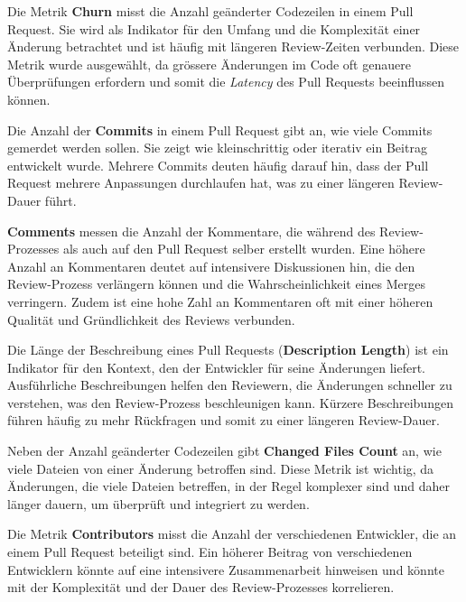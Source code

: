 Die Metrik \textbf{Churn} misst die Anzahl geänderter Codezeilen in einem Pull Request. Sie wird als Indikator für den Umfang und die Komplexität einer Änderung betrachtet und ist häufig mit längeren Review-Zeiten verbunden. Diese Metrik wurde ausgewählt, da grössere Änderungen im Code oft genauere Überprüfungen erfordern und somit die \textit{Latency} des Pull Requests beeinflussen können. \parencite{gousios_exploratory_2014}

Die Anzahl der \textbf{Commits} in einem Pull Request gibt an, wie viele Commits gemerdet werden sollen. Sie zeigt wie kleinschrittig oder iterativ ein Beitrag entwickelt wurde. Mehrere Commits deuten häufig darauf hin, dass der Pull Request mehrere Anpassungen durchlaufen hat, was zu einer längeren Review-Dauer führt. \parencite{zhang_pull_2022}

\textbf{Comments} messen die Anzahl der Kommentare, die während des Review-Prozesses als auch auf den Pull Request selber erstellt wurden. Eine höhere Anzahl an Kommentaren deutet auf intensivere Diskussionen hin, die den Review-Prozess verlängern können und die Wahrscheinlichkeit eines Merges verringern. Zudem ist eine hohe Zahl an Kommentaren oft mit einer höheren Qualität und Gründlichkeit des Reviews verbunden. \parencite{tsay_influence_2014}

Die Länge der Beschreibung eines Pull Requests (\textbf{Description Length}) ist ein Indikator für den Kontext, den der Entwickler für seine Änderungen liefert. Ausführliche Beschreibungen helfen den Reviewern, die Änderungen schneller zu verstehen, was den Review-Prozess beschleunigen kann. Kürzere Beschreibungen führen häufig zu mehr Rückfragen und somit zu einer längeren Review-Dauer. \parencite{zhang_pull_2022}

Neben der Anzahl geänderter Codezeilen gibt \textbf{Changed Files Count} an, wie viele Dateien von einer Änderung betroffen sind. Diese Metrik ist wichtig, da Änderungen, die viele Dateien betreffen, in der Regel komplexer sind und daher länger dauern, um überprüft und integriert zu werden. \parencite{tsay_influence_2014}

Die Metrik \textbf{Contributors} misst die Anzahl der verschiedenen Entwickler, die an einem Pull Request beteiligt sind. Ein höherer Beitrag von verschiedenen Entwicklern könnte auf eine intensivere Zusammenarbeit hinweisen und könnte mit der Komplexität und der Dauer des Review-Prozesses korrelieren.

\newpage  
